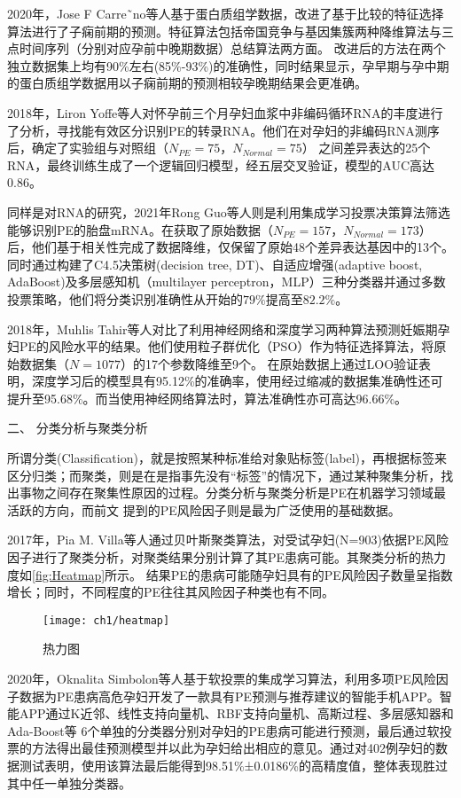 2020年，Jose F Carre˜no等人\cite{Carreno2020}基于蛋白质组学数据，改进了基于比较的特征选择算法进行了子痫前期的预测。特征算法包括帝国竞争与基因集簇两种降维算法与三点时间序列（分别对应孕前中晚期数据）总结算法两方面。
改进后的方法在两个独立数据集上均有90\%左右(85\%-93\%)的准确性，同时结果显示，孕早期与孕中期的蛋白质组学数据用以子痫前期的预测相较孕晚期结果会更准确。

2018年，Liron Yoffe等人\cite{Yoffe2018}对怀孕前三个月孕妇血浆中非编码循环RNA的丰度进行了分析，寻找能有效区分识别PE的转录RNA。他们在对孕妇的非编码RNA测序后，确定了实验组与对照组（$N_{PE}=75$，$N_{Normal}=75$）
之间差异表达的25个RNA，最终训练生成了一个逻辑回归模型，经五层交叉验证，模型的AUC高达0.86。

同样是对RNA的研究，2021年Rong Guo等人\cite{Guo2021}则是利用集成学习投票决策算法筛选能够识别PE的胎盘mRNA。在获取了原始数据（$N_{PE}=157$，$N_{Normal}=173$）后，他们基于相关性完成了数据降维，仅保留了原始48个差异表达基因中的13个。
同时通过构建了C4.5决策树(decision tree, DT)、自适应增强(adaptive boost, AdaBoost)及多层感知机（multilayer perceptron，MLP）三种分类器并通过多数投票策略，他们将分类识别准确性从开始的$79\%$提高至$82.2\%$。

2018年，Muhlis Tahir等人\cite{Tahir2018,Tahir2018-2}对比了利用神经网络和深度学习两种算法预测妊娠期孕妇PE的风险水平的结果。他们使用粒子群优化（PSO）作为特征选择算法，将原始数据集（$N=1077$）的17个参数降维至9个。
在原始数据上通过LOO验证表明，深度学习后的模型具有95.12\%的准确率，使用经过缩减的数据集准确性还可提升至95.68\%。而当使用神经网络算法时，算法准确性亦可高达96.66\%。

二、 分类分析与聚类分析

所谓分类(Classification)，就是按照某种标准给对象贴标签(label)，再根据标签来区分归类；而聚类，则是在是指事先没有“标签”的情况下，通过某种聚集分析，找出事物之间存在聚集性原因的过程。分类分析与聚类分析是PE在机器学习领域最活跃的方向，而前文
提到的PE风险因子则是最为广泛使用的基础数据。

2017年，Pia M. Villa等人\cite{Villa2017}通过贝叶斯聚类算法，对受试孕妇(N=903)依据PE风险因子进行了聚类分析，对聚类结果分别计算了其PE患病可能。其聚类分析的热力度如\autoref{fig:Heatmap}所示。
结果PE的患病可能随孕妇具有的PE风险因子数量呈指数增长；同时，不同程度的PE往往其风险因子种类也有不同。
\begin{figure}[htbp]
    \centering
    \texttt{[image: ch1/heatmap]}
    \caption{\label{fig:Heatmap}热力图}
\end{figure}

2020年，Oknalita Simbolon等人\cite{Simbolon2020}基于软投票的集成学习算法，利用多项PE风险因子数据为PE患病高危孕妇开发了一款具有PE预测与推荐建议的智能手机APP。智能APP通过K近邻、线性支持向量机、RBF支持向量机、高斯过程、多层感知器和Ada-Boost等
6个单独的分类器分别对孕妇的PE患病可能进行预测，最后通过软投票的方法得出最佳预测模型并以此为孕妇给出相应的意见。通过对402例孕妇的数据测试表明，使用该算法最后能得到98.51\%±0.0186\%的高精度值，整体表现胜过其中任一单独分类器。

